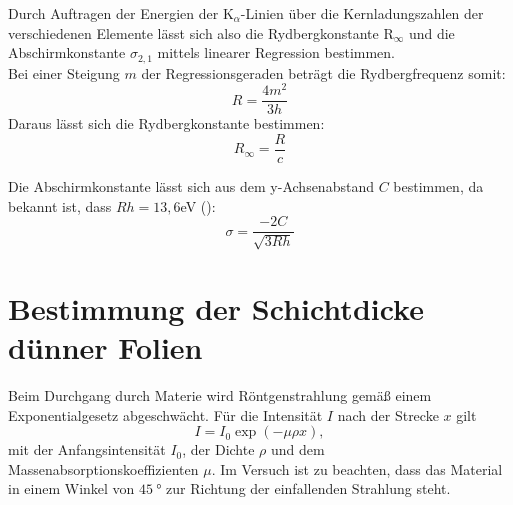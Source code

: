Durch Auftragen der Energien der K$_\alpha$-Linien über die Kernladungszahlen der verschiedenen Elemente lässt sich also die Rydbergkonstante R$_\infty$ und die Abschirmkonstante $\sigma_{2,1}$ mittels linearer Regression bestimmen.\\
Bei einer Steigung $m$ der Regressionsgeraden beträgt die Rydbergfrequenz somit:
\begin{equation}
	R = \frac{4m^2}{3h}
	\label{eq:rhydberg}
\end{equation}
Daraus lässt sich die Rydbergkonstante bestimmen:
\begin{equation}
	R_{\infty} = \frac{R}{c}
\end{equation}

Die Abschirmkonstante lässt sich aus dem y-Achsenabstand $C$ bestimmen, da bekannt ist, dass $Rh = 13,6$\;eV (\cite{litmap}):
\begin{equation}
	\sigma = \frac{-2C}{\sqrt{3Rh}}
	\label{eq:abschirm}
\end{equation}
\section{Bestimmung der Schichtdicke dünner Folien}

Beim Durchgang durch Materie wird Röntgenstrahlung gemäß einem Exponentialgesetz abgeschwächt. Für die Intensität $I$ nach der Strecke $x$ gilt
\begin{equation}
 I = I_{0}\exp(-\mu\rho x),
\end{equation}
mit der Anfangsintensität $I_{0}$, der Dichte $\rho$ und dem Massenabsorptionskoeffizienten $\mu$. Im Versuch ist zu beachten, dass das Material in einem Winkel von $\SI{45}{\degree}$ zur Richtung der einfallenden Strahlung steht.




